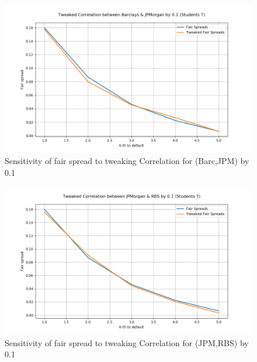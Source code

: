 \documentclass{report}
\theoremstyle{plain}
\theoremstyle{definition}
\begin{document}
\begin{figure}[H]
	\begin{center}
		\includegraphics[width=15cm]{Tweaked_Correlation_between_Barclays_&_JPMorgan_by_0,1_(Students_T).png}
		\caption{Sensitivity of fair spread to tweaking Correlation for (Barc,JPM) by 0.1} 
		\label{Tweaked_Correlation_between_Barclays_&_JPMorgan_by_0.1_(Students_T)}
	\end{center}
\end{figure}

\begin{figure}[H]
	\begin{center}
		\includegraphics[width=15cm]{Tweaked_Correlation_between_JPMorgan_&_RBS_by_0,1_(Students_T).png}
		\caption{Sensitivity of fair spread to tweaking Correlation for (JPM,RBS) by 0.1} 
		\label{Tweaked_Correlation_between_JPMorgan_&_RBS_by_0.1_(Students_T)}
	\end{center}
\end{figure}
\end{document}
